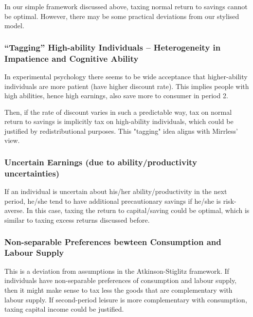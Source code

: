         In our simple framework discussed above, taxing normal return to savings cannot be optimal. However, there may be some practical deviations from our stylised model.

        \subsubsection{``Tagging'' High-ability Individuals -- Heterogeneity in Impatience and Cognitive Ability}

            In experimental psychology there seems to be wide acceptance that higher-ability individuals are more patient (have higher discount rate). This implies people with high abilities, hence high earnings, also save more to consumer in period 2.

            Then, if the rate of discount varies in such a predictable way, tax on normal return to savings is implicitly tax on high-ability individuals, which could be justified by redistributional purposes. This "tagging" idea aligns with Mirrless' view.

        \subsubsection{Uncertain Earnings (due to ability/productivity uncertainties)}

            If an individual is uncertain about his/her ability/productivity in the next period, he/she tend to have additional precautionary savings if he/she is risk-averse. In this case, taxing the return to capital/saving could be optimal, which is similar to taxing excess returns discussed before.

        \subsubsection{Non-separable Preferences bewteen Consumption and Labour Supply}\label{subsubsec:non_separable_pref}

            This is a deviation from assumptions in the Atkinson-Stiglitz framework. If individuals have non-separable preferences of consumption and labour supply, then it might make sense to tax less the goods that are complementary with labour supply. If second-period leisure is more complementary with consumption, taxing capital income could be justified.